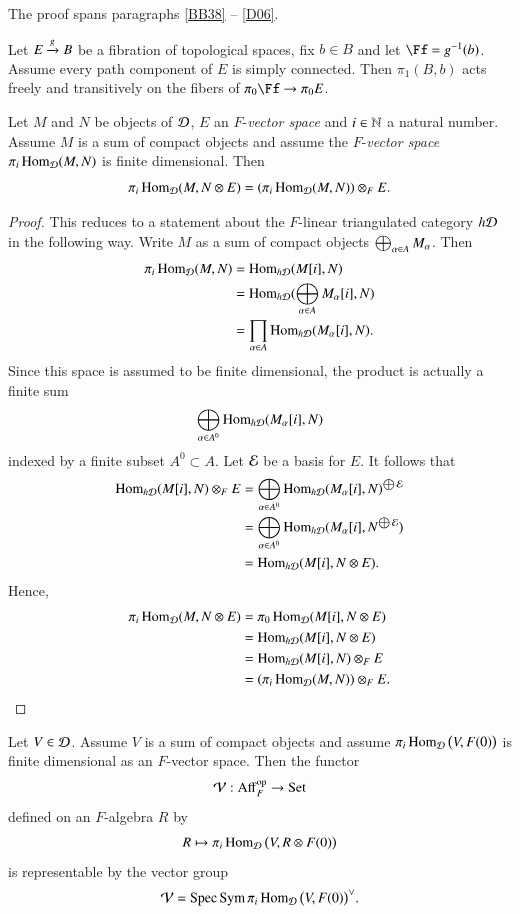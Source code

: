 The proof spans paragraphs \ref{BB38} -- \ref{D06}. 


\sspar{}
\label{BB38}
Let $E \xrightarrow{g} B$ be a fibration of topological spaces, fix $b \in B$ and let $\Ff = g\inv(b)$. Assume every path component of $E$ is simply connected. Then $\pi_1(B,b)$ acts freely and transitively on the fibers of $\pi_0\Ff \to \pi_0E$. 


\begin{ssLemma}
\label{D03}
Let $M$ and $N$ be objects of $\mathcal{D}$, $E$ an $F$-\textit{vector space} and $i \in \mathbb{N}$ a natural number. Assume $M$ is a sum of compact objects and assume the $F$-\textit{vector space} $\pi_i \operatorname{Hom}_{\mathcal{D}}(M,N)$ is finite dimensional. Then
\[
\pi_i\operatorname{Hom}_{\mathcal{D}}(M, N\otimes E)
 = (\pi_i\operatorname{Hom}_{\mathcal{D}}(M,N)) \otimes_F E.
\]
\end{ssLemma}

\begin{proof}
This reduces to a statement about the $F$-linear triangulated category $h\mathcal{D}$ in the following way. Write $M$ as a sum of compact objects $\bigoplus_{\alpha \in A} M_\alpha$. Then 
\begin{align*}
\pi_i \operatorname{Hom}_{\mathcal{D}}(M,N)
 &= \operatorname{Hom}_{h\mathcal{D}}(M[i],N) 
\\
&= \operatorname{Hom}_{h\mathcal{D}}(\bigoplus_{\alpha \in A} M_\alpha[i], N)
\\
&= \prod_{\alpha \in A} \operatorname{Hom}_{h\mathcal{D}}(M_\alpha[i], N).
\end{align*}
Since this space is assumed to be finite dimensional, the product is actually a finite sum
\[
\bigoplus_{\alpha \in A^0} \operatorname{Hom}_{h\mathcal{D}}(M_\alpha[i], N)
\]
indexed by a finite subset $A^0 \subset A$. Let $\mathcal{E}$ be a basis for $E$. It follows that
\begin{align*}
\operatorname{Hom}_{h\mathcal{D}}(M[i],N) \otimes_F E
&= \bigoplus_{\alpha \in A^0} \operatorname{Hom}_{h\mathcal{D}}(M_\alpha[i],N)^{\bigoplus \mathcal{E}}
\\
&= \bigoplus_{\alpha \in A^0} \operatorname{Hom}_{h\mathcal{D}}(M_\alpha[i],N^{\bigoplus \mathcal{E}})
\\
&= \operatorname{Hom}_{h\mathcal{D}}(M[i], N \otimes E).
\end{align*}
Hence,
\begin{align*}
\pi_i\operatorname{Hom}_{\mathcal{D}}(M, N\otimes E)
&= \pi_0 \operatorname{Hom}_{\mathcal{D}}(M[i], N\otimes E)
\\
&= \operatorname{Hom}_{h\mathcal{D}}(M[i], N\otimes E)
\\
&= \operatorname{Hom}_{h\mathcal{D}}(M[i], N) \otimes_F E
\\
& = (\pi_i\operatorname{Hom}_{\mathcal{D}}(M,N)) \otimes_F E.
\qedhere
\end{align*}
\end{proof}


\begin{ssLemma}
\label{rep4}
Let $V \in \mathcal{D}$. Assume $V$ is a sum of compact objects and assume $\pi_i \operatorname{Hom}_{\mathcal{D}} \big(V, F(0) \big)$ is finite dimensional as an $F$-vector space. Then the functor 
\[
\mathcal{V}: \operatorname{Aff}_F^{\mathrm{op}} \to \operatorname{Set}
\]
defined on an $F$-algebra $R$ by 
\[
R \mapsto 
\pi_i\operatorname{Hom}_{\mathcal{D}} \big( V, R \otimes F(0)\big)
\]
is representable by the vector group 
\[
\mathcal{V} = \operatorname{Spec} \operatorname{Sym} \pi_i \operatorname{Hom}_{\mathcal{D}} \big( V, F(0)\big)^\lor.
\]
\end{ssLemma}


